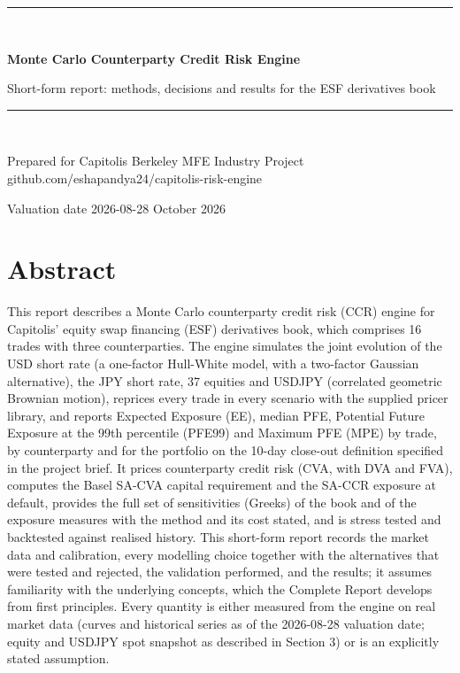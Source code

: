 \documentclass[11pt,letterpaper]{article}
\begin{document}
\begin{titlepage}
\vspace*{1.6in}
{\color{navy}\rule{\linewidth}{1.2pt}}\\[1.2em]
{\Huge\bfseries\color{navy} Monte Carlo Counterparty Credit Risk Engine\par}
\vspace{0.6em}
{\Large Short-form report: methods, decisions and results for the ESF derivatives book\par}
\vspace{0.6em}
{\color{navy}\rule{\linewidth}{1.2pt}}\\[2em]
{\large Prepared for Capitolis \textbar{} Berkeley MFE Industry Project \textbar{} github.com/eshapandya24/capitolis-risk-engine\par}
\vspace{0.4em}
{\normalsize Valuation date 2026-08-28 \textbar{} October 2026\par}
\end{titlepage}
\section*{Abstract}
This report describes a Monte Carlo counterparty credit risk (CCR) engine for Capitolis' equity swap financing (ESF) derivatives book, which comprises 16 trades with three counterparties. The engine simulates the joint evolution of the USD short rate (a one-factor Hull-White model, with a two-factor Gaussian alternative), the JPY short rate, 37 equities and USDJPY (correlated geometric Brownian motion), reprices every trade in every scenario with the supplied pricer library, and reports Expected Exposure (EE), median PFE, Potential Future Exposure at the 99th percentile (PFE99) and Maximum PFE (MPE) by trade, by counterparty and for the portfolio on the 10-day close-out definition specified in the project brief. It prices counterparty credit risk (CVA, with DVA and FVA), computes the Basel SA-CVA capital requirement and the SA-CCR exposure at default, provides the full set of sensitivities (Greeks) of the book and of the exposure measures with the method and its cost stated, and is stress tested and backtested against realised history. This short-form report records the market data and calibration, every modelling choice together with the alternatives that were tested and rejected, the validation performed, and the results; it assumes familiarity with the underlying concepts, which the Complete Report develops from first principles. Every quantity is either measured from the engine on real market data (curves and historical series as of the 2026-08-28 valuation date; equity and USDJPY spot snapshot as described in Section 3) or is an explicitly stated assumption.
\end{document}
